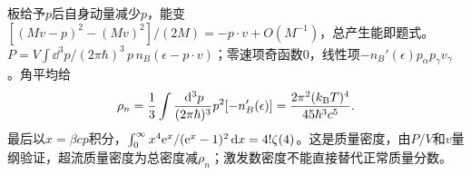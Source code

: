 \begin{solution}
板给予$p$后自身动量减少$p$，能变$[(Mv-p)^2-(Mv)^2]/(2M)=-p\cdot v+O(M^{-1})$，总产生能即题式。$P=V\int\dd^3p/(2\pi\hbar)^3\,p\,n_B(\epsilon-p\cdot v)$；零速项奇函数0，线性项$-n_B'(\epsilon)p_\alpha p_\gamma v_\gamma$。角平均给
\begin{equation}
\rho_n=\frac13\int\frac{\,\mathrm d^3p}{(2\pi\hbar)^3}p^2[-n_B'(\epsilon)]=\frac{2\pi^2(k_{\mathrm B} T)^4}{45\hbar^3c^5}.
\end{equation}
最后以$x=\beta cp$积分，$\int_0^\infty x^4\mathrm e^x/(\mathrm e^x-1)^2\,\mathrm d x=4!\zeta(4)$。这是质量密度，由$P/V$和$v$量纲验证，超流质量密度为总密度减$\rho_n$；激发数密度不能直接替代正常质量分数。
\end{solution}
